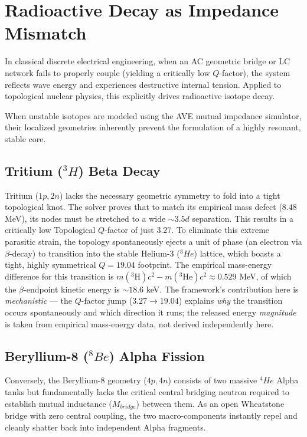 \section{Radioactive Decay as Impedance Mismatch}
In classical discrete electrical engineering, when an AC geometric bridge or LC network fails to properly couple (yielding a critically low $Q$-factor), the system reflects wave energy and experiences destructive internal tension. Applied to topological nuclear physics, this explicitly drives radioactive isotope decay.

When unstable isotopes are modeled using the AVE mutual impedance simulator, their localized geometries inherently prevent the formulation of a highly resonant, stable core.

\subsection{Tritium ($^3H$) Beta Decay}
Tritium ($1p, 2n$) lacks the necessary geometric symmetry to fold into a tight topological knot. The solver proves that to match its empirical mass defect ($8.48$ MeV), its nodes must be stretched to a wide $\sim 3.5d$ separation. This results in a critically low Topological $Q$-factor of just $3.27$. To eliminate this extreme parasitic strain, the topology spontaneously ejects a unit of phase (an electron via $\beta$-decay) to transition into the stable Helium-3 ($^3He$) lattice, which boasts a tight, highly symmetrical $Q=19.04$ footprint. The empirical mass-energy difference for this transition is $m(^3\text{H})c^2 - m(^3\text{He})c^2 \approx 0.529$ MeV, of which the $\beta$-endpoint kinetic energy is $\sim 18.6$ keV. The framework's contribution here is \textit{mechanistic} --- the $Q$-factor jump ($3.27 \to 19.04$) explains \textit{why} the transition occurs spontaneously and which direction it runs; the released energy \textit{magnitude} is taken from empirical mass-energy data, not derived independently here.

\subsection{Beryllium-8 ($^8Be$) Alpha Fission}
Conversely, the Beryllium-8 geometry ($4p, 4n$) consists of two massive $^4He$ Alpha tanks but fundamentally lacks the critical central bridging neutron required to establish mutual inductance ($M_{bridge}$) between them. As an open Wheatstone bridge with zero central coupling, the two macro-components instantly repel and cleanly shatter back into independent Alpha fragments.


